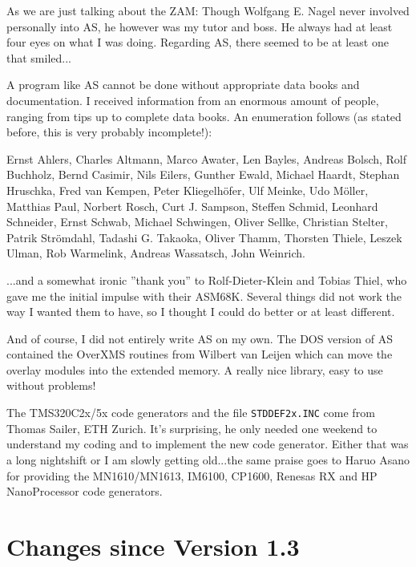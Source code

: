 \documentclass[12pt,twoside]{report}
\newcommand{\tty}[1]{{\tt #1}}
\newcommand{\asname}{{AS}}
\begin{document}
As we are just talking about the ZAM: Though Wolfgang E. Nagel never
involved personally into \asname{}, he however was my tutor and
boss.  He always had at least four eyes on what I was doing.
Regarding \asname{}, there seemed to be at least one that smiled...

A program like \asname{} cannot be done without appropriate data books and
documentation.  I received information from an enormous amount of
people, ranging from tips up to complete data books.  An enumeration
follows (as stated before, this is very probably incomplete!):

Ernst Ahlers, Charles Altmann, Marco Awater, Len Bayles,
Andreas Bolsch, Rolf Buchholz, Bernd Casimir, Nils Eilers,
Gunther Ewald, Michael Haardt, Stephan Hruschka,  Fred van Kempen,
Peter Kliegelh\"ofer, Ulf Meinke, Udo M\"oller, Matthias Paul,
Norbert Rosch, Curt J. Sampson, Steffen Schmid, Leonhard Schneider,
Ernst Schwab, Michael Schwingen, Oliver Sellke, Christian Stelter,
Patrik Str\"omdahl, Tadashi G. Takaoka, Oliver Thamm, Thorsten Thiele,
Leszek Ulman, Rob Warmelink, Andreas Wassatsch, John Weinrich.

...and a somewhat ironic ''thank you'' to Rolf-Dieter-Klein and Tobias
Thiel, who gave me the initial impulse with their ASM68K.  Several things
did not work the way I wanted them to have, so I thought I could do
better or at least different.

And of course, I did not entirely write \asname{} on my own.  The DOS
version of \asname{} contained the OverXMS routines from Wilbert van
Leijen which can move the overlay modules into the extended memory.
A really nice library, easy to use without problems!

The TMS320C2x/5x code generators and the file \tty{STDDEF2x.INC} come
from Thomas Sailer, ETH Zurich.  It's surprising, he only needed one
weekend to understand my coding and to implement the new code
generator.  Either that was a long nightshift or I am slowly getting
old...the same praise goes to Haruo Asano for providing the
MN1610/MN1613, IM6100, CP1600, Renesas RX and HP NanoProcessor code
generators.


\cleardoublepage
\chapter{Changes since Version 1.3}
\end{document}
